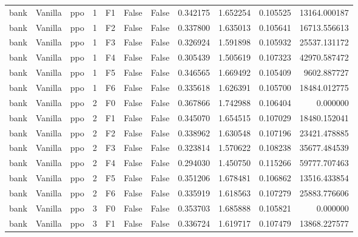 \begin{tabular}{lllrlllrrrr}
      bank & Vanilla &       ppo &     1 &  F1 &           False &            False &  0.342175 &  1.652254 & 0.105525 &     13164.000187 \\
      bank & Vanilla &       ppo &     1 &  F2 &           False &            False &  0.337800 &  1.635013 & 0.105641 &     16713.556613 \\
      bank & Vanilla &       ppo &     1 &  F3 &           False &            False &  0.326924 &  1.591898 & 0.105932 &     25537.131172 \\
      bank & Vanilla &       ppo &     1 &  F4 &           False &            False &  0.305439 &  1.505619 & 0.107323 &     42970.587472 \\
      bank & Vanilla &       ppo &     1 &  F5 &           False &            False &  0.346565 &  1.669492 & 0.105409 &      9602.887727 \\
      bank & Vanilla &       ppo &     1 &  F6 &           False &            False &  0.335618 &  1.626391 & 0.105700 &     18484.012775 \\
      bank & Vanilla &       ppo &     2 &  F0 &           False &            False &  0.367866 &  1.742988 & 0.106404 &         0.000000 \\
      bank & Vanilla &       ppo &     2 &  F1 &           False &            False &  0.345070 &  1.654515 & 0.107029 &     18480.152041 \\
      bank & Vanilla &       ppo &     2 &  F2 &           False &            False &  0.338962 &  1.630548 & 0.107196 &     23421.478885 \\
      bank & Vanilla &       ppo &     2 &  F3 &           False &            False &  0.323814 &  1.570622 & 0.108238 &     35677.484539 \\
      bank & Vanilla &       ppo &     2 &  F4 &           False &            False &  0.294030 &  1.450750 & 0.115266 &     59777.707463 \\
      bank & Vanilla &       ppo &     2 &  F5 &           False &            False &  0.351206 &  1.678481 & 0.106862 &     13516.433854 \\
      bank & Vanilla &       ppo &     2 &  F6 &           False &            False &  0.335919 &  1.618563 & 0.107279 &     25883.776606 \\
      bank & Vanilla &       ppo &     3 &  F0 &           False &            False &  0.353703 &  1.685888 & 0.105821 &         0.000000 \\
      bank & Vanilla &       ppo &     3 &  F1 &           False &            False &  0.336724 &  1.619717 & 0.107479 &     13868.227577 \\

\end{tabular}
